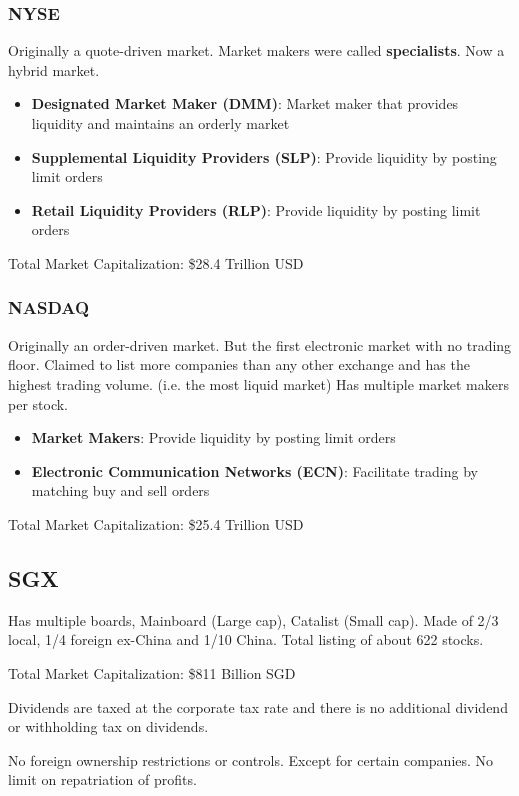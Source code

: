 \subsubsection{NYSE}
Originally a quote-driven market.
Market makers were called \textbf{specialists}.
Now a hybrid market.
\begin{itemize}
    \item \textbf{Designated Market Maker (DMM)}: Market maker that provides liquidity and maintains an orderly market
    \item \textbf{Supplemental Liquidity Providers (SLP)}: Provide liquidity by posting limit orders
    \item \textbf{Retail Liquidity Providers (RLP)}: Provide liquidity by posting limit orders
\end{itemize}

Total Market Capitalization: \$28.4 Trillion USD

\subsubsection{NASDAQ}
Originally an order-driven market. But the first electronic market with no trading floor.
Claimed to list more companies than any other exchange and has the highest trading volume. (i.e. the most liquid market)
Has multiple market makers per stock.
\begin{itemize}
    \item \textbf{Market Makers}: Provide liquidity by posting limit orders
    \item \textbf{Electronic Communication Networks (ECN)}: Facilitate trading by matching buy and sell orders
\end{itemize}

Total Market Capitalization: \$25.4 Trillion USD

\subsection{SGX}
Has multiple boards, Mainboard (Large cap), Catalist (Small cap).
Made of 2/3 local, 1/4 foreign ex-China and 1/10 China. Total listing of about 622 stocks.

Total Market Capitalization: \$811 Billion SGD

Dividends are taxed at the corporate tax rate and there is no additional dividend or withholding tax on dividends.

No foreign ownership restrictions or controls. Except for certain companies. No limit on repatriation of profits.


